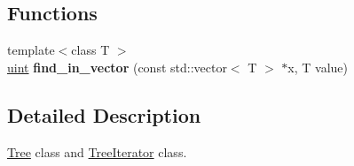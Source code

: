 \subsection*{Functions}
\begin{DoxyCompactItemize}
\item 
{\footnotesize template$<$class T $>$ }\\\hyperlink{namespacepruner_a659e6e64a9e2b8e981c3d34262a2f67e}{uint} {\bfseries find\+\_\+in\+\_\+vector} (const std\+::vector$<$ T $>$ $\ast$x, T value)\hypertarget{namespacepruner_a351966f6c1802af422254d6ee004eea6}{}\label{namespacepruner_a351966f6c1802af422254d6ee004eea6}

\end{DoxyCompactItemize}


\subsection{Detailed Description}
\hyperlink{classpruner_1_1Tree}{Tree} class and \hyperlink{classpruner_1_1TreeIterator}{Tree\+Iterator} class. 